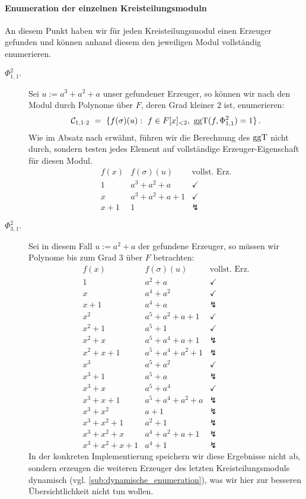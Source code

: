 \paragraph{Enumeration der einzelnen Kreisteilungsmoduln}
An diesem Punkt haben wir für jeden Kreisteilungsmodul einen Erzeuger gefunden
und können anhand diesem den jeweiligen Modul vollständig enumerieren.
\begin{description}
  \item[$\Phi_{1,1}^2.$] Sei $u := a^3+a^2+a$ unser gefundener Erzeuger, so können
    wir nach  den Modul durch Polynome über
    $F$, deren Grad kleiner $2$ ist, enumerieren:
    \[ \C_{1,1\cdot 2} \speq= \{ f(\sigma)(u):\ 
      f \in F[x]_{<2},\ \ggT(f,\Phi_{1,1}^2) = 1\}\,.\]
    Wie im Absatz nach  erwähnt, führen wir die
    Berechnung des $\operatorname{ggT}$ nicht durch, sondern testen jedes Element auf
    vollständige Erzeuger-Eigenschaft für diesen Modul.
    \[\begin{array}{l|l|l}
      f(x) & f(\sigma)(u) & \text{vollst. Erz.}\\\hline
      1 & a^3+a^2+a & \checkmark\\
      x & a^3+a^2+a+1 & \checkmark\\
      x+1 & 1 & \lightning
      \end{array}\]
  \item [$\Phi_{3,1}^2.$] Sei in diesem Fall $u:= a^2+a$ der gefundene
    Erzeuger, so müssen wir Polynome bis zum Grad $3$ über $F$ betrachten:
    \[\begin{array}{l|l|l}
      f(x) & f(\sigma)(u) & \text{vollst. Erz.}\\\hline
      1 & a^2+a & \checkmark\\
      x & a^4+a^2 & \checkmark\\
      x+1 & a^4+a & \lightning\\
      x^2 & a^5+a^2+a+1 & \checkmark\\
      x^2+1 & a^5+1 & \checkmark\\
      x^2+x & a^5+a^4+a+1 & \lightning\\
      x^2+x+1 & a^5+a^4+a^2+1 & \lightning\\
      x^3 & a^5+a^2 & \checkmark\\
      x^3+1 & a^5+a & \lightning\\
      x^3+x & a^5+a^4 & \checkmark\\
      x^3+x+1 & a^5+a^4+a^2+a & \lightning\\
      x^3+x^2 & a+1 & \lightning\\
      x^3+x^2+1 & a^2+1 & \lightning\\
      x^3+x^2+x & a^4+a^2+a+1 & \lightning\\
      x^3+x^2+x+1 & a^4+1 & \lightning
      \end{array}\]
    In der konkreten Implementierung speichern wir diese Ergebnisse nicht ab,
    sondern erzeugen die weiteren Erzeuger des letzten Kreisteilungsmoduls
    dynamisch (vgl.  
    \autoref{sub:dynamische_enumeration}), was
    wir hier zur besseren Übersichtlichkeit nicht tun wollen.
\end{description}

